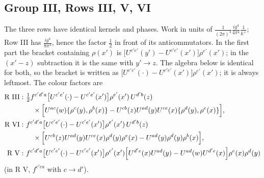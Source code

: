 \documentclass[9pt]{article}
\numberwithin{equation}{section}
\begin{document}
\subsection{Group III, Rows III, V, VI}
The three rows have identical kernels and phases. Work in units of $\frac{1}{(2\pi)^{3}}\frac{ig^{4}}{4\pi^{4}}\frac{1}{k^{+}}$; Row III has $\frac{ig^{4}}{8\pi^{4}}$, hence the factor $\frac12$ in front of its anticommutators. In the first part the bracket containing $\rho(x')$ is $\big[U^{c'e'}(y')-U^{c'e'}(x')\big]\rho^{e'}(x')$; in the $(x'-z)$ subtraction it is the same with $y'\to z$. The algebra below is identical for both, so the bracket is written as $\big[U^{c'e'}(\cdot)-U^{c'e'}(x')\big]\rho^{e'}(x')$; it is always leftmost. The colour factors are
\begin{align}
\text{R III}:\ &\tfrac12f^{c'd'a}\big[U^{c'e'}(\cdot)-U^{c'e'}(x')\big]\rho^{e'}(x')\,U^{d'b}(z)\notag\\
&\quad\times\Big[U^{ac}(w)\{\rho^{c}(y),\rho^{b}(x)\}-U^{cb}(z)U^{ad}(y)U^{ce}(x)\{\rho^{d}(y),\rho^{e}(x)\}\Big],\notag\\
\text{R VI}:\ &f^{c'd'a}\big[U^{c'e'}(\cdot)-U^{c'e'}(x')\big]\rho^{e'}(x')\,U^{d'b}(z)\notag\\
&\quad\times\Big[U^{cb}(z)U^{ad}(y)U^{ce}(x)\rho^{d}(y)\rho^{e}(x)-U^{ad}(y)\rho^{d}(y)\rho^{b}(x)\Big],\notag\\
\text{R V}:\ &f^{c'd'a}\big[U^{c'e'}(\cdot)-U^{c'e'}(x')\big]\rho^{e'}(x')\Big[U^{d'e}(x)U^{ad}(y)-U^{ad}(w)U^{d'e}(x)\Big]\rho^{e}(x)\rho^{d}(y)
\end{align}
(in R V, $f^{c'ca}$ with $c\to d'$).
\end{document}
